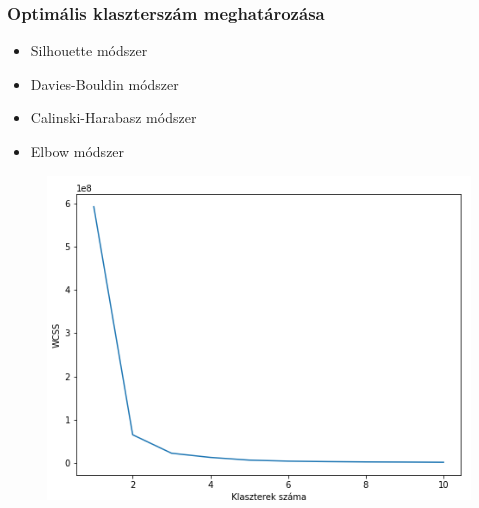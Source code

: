 \documentclass{beamer}
\begin{document}
\begin{frame}[fragile]
\frametitle{Optimális klaszterszám meghatározása}

\begin{itemize}
    \item Silhouette módszer
    \item Davies-Bouldin módszer
    \item Calinski-Harabasz módszer
    \item Elbow módszer
\end{itemize}

\begin{figure}[!tbp]
  \centering
  \begin{minipage}[b]{0.7\textwidth}
      \includegraphics[width=\textwidth]{images/elbow_grayscale.png}
  \end{minipage}
\end{figure}

\end{frame}
\end{document}
